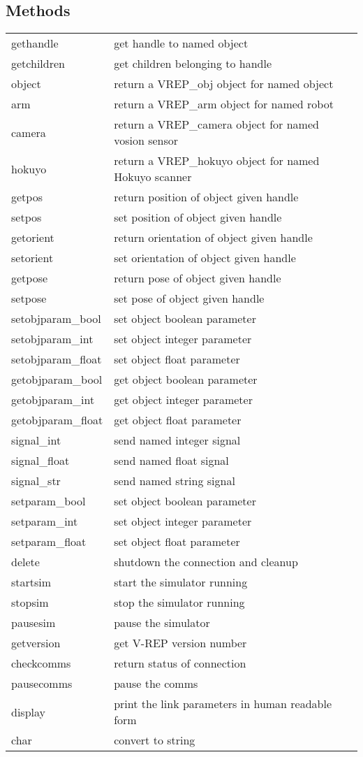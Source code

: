 \documentclass[a4paper]{article}
\begin{document}
\subsection*{Methods}
\begin{tabular}{lp{120mm}}
 gethandle & get handle to named object\\ 
 getchildren & get children belonging to handle\\ 
\hline
 object & return a VREP\_obj object for named object\\ 
 arm & return a VREP\_arm object for named robot\\ 
 camera & return a VREP\_camera object for named vosion sensor\\ 
 hokuyo & return a VREP\_hokuyo object for named Hokuyo scanner\\ 
\hline
 getpos & return position of object given handle\\ 
 setpos & set position of object given handle\\ 
 getorient & return orientation of object given handle\\ 
 setorient & set orientation of object given handle\\ 
 getpose & return pose of object given handle\\ 
 setpose & set pose of object given handle\\ 
\hline
 setobjparam\_bool & set object boolean parameter\\ 
 setobjparam\_int & set object integer parameter\\ 
 setobjparam\_float & set object float parameter\\ 
 getobjparam\_bool & get object boolean parameter\\ 
 getobjparam\_int & get object integer parameter\\ 
 getobjparam\_float & get object float parameter\\ 
\hline
 signal\_int & send named integer signal\\ 
 signal\_float & send named float signal\\ 
 signal\_str & send named string signal\\ 
\hline
 setparam\_bool & set object boolean parameter\\ 
 setparam\_int & set object integer parameter\\ 
 setparam\_float & set object float parameter\\ 
\hline
 delete & shutdown the connection and cleanup\\ 
\hline
 startsim & start the simulator running\\ 
 stopsim & stop the simulator running\\ 
 pausesim & pause the simulator\\ 
 getversion & get V-REP version number\\ 
 checkcomms & return status of connection\\ 
 pausecomms & pause the comms\\ 
\hline
 display & print the link parameters in human readable form\\ 
 char & convert to string\\ 
\end{tabular}\vspace{1ex}
\end{document}
